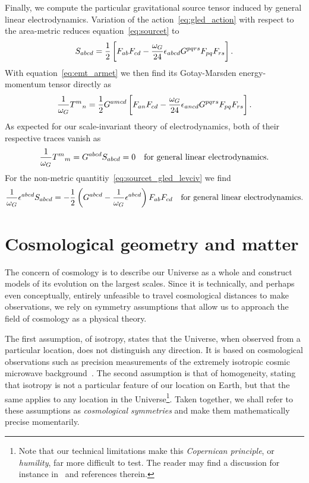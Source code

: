 Finally, we compute the particular gravitational source tensor induced by general linear electrodynamics. Variation of the action~\eqref{eq:gled_action} with respect to the area-metric reduces equation~\eqref{eq:sourcet} to
\begin{equation}\label{eq:sourcet_gled}
	S_{abcd}=\frac{1}{2}\left[F_{ab}F_{cd}-\frac{\omega_G}{24}\epsilon_{abcd}G^{pqrs}F_{pq}F_{rs}\right]
	\mathpunct{.}
\end{equation}
With equation~\eqref{eq:emt_armet} we then find its Gotay-Marsden energy-momentum tensor directly as
\begin{equation}\label{eq:emt_gled}
	\frac{1}{\omega_G}{T^m}_n=\frac{1}{2}G^{amcd}\left[F_{an}F_{cd}-\frac{\omega_G}{24}\epsilon_{ancd}G^{pqrs}F_{pq}F_{rs}\right]
	\mathpunct{.}
\end{equation}
As expected for our scale-invariant theory of electrodynamics, both of their respective traces vanish as
\begin{equation}
	\frac{1}{\omega_G}{T^m}_m=G^{abcd}S_{abcd}=0 \quad \text{for general linear electrodynamics.}
\end{equation}
For the non-metric quantitiy~\eqref{eq:sourcet_gled_levciv} we find
\begin{equation}
	\frac{1}{\omega_G}\epsilon^{abcd}S_{abcd}=-\frac{1}{2}\left(G^{abcd}-\frac{1}{\omega_G}\epsilon^{abcd}\right)F_{ab}F_{cd} \quad \text{for general linear electrodynamics.}
\end{equation}




\chapter{Cosmological geometry and matter}\label{sec:symm}

The concern of cosmology is to describe our Universe as a whole and construct models of its evolution on the largest scales. Since it is technically, and perhaps even conceptually, entirely unfeasible to travel cosmological distances to make observations, we rely on symmetry assumptions that allow us to approach the field of cosmology as a physical theory.


The first assumption, of isotropy, states that the Universe, when observed from a particular location, does not distinguish any direction. It is based on cosmological observations such as precision measurements of the extremely isotropic cosmic microwave background~\autocite{Planck2015}. The second assumption is that of homogeneity, stating that isotropy is not a particular feature of our location on Earth, but that the same applies to any location in the Universe\footnote{Note that our technical limitations make this \emph{Copernican principle}, or \emph{humility}, far more difficult to test. The reader may find a discussion for instance in~\autocite{Schwarz2015} and references therein.}. Taken together, we shall refer to these assumptions as \emph{cosmological symmetries} and make them mathematically precise momentarily.

